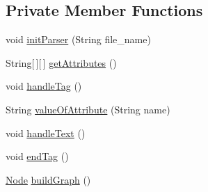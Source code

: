 \subsection*{Private Member Functions}
\begin{DoxyCompactItemize}
\item 
void \hyperlink{classch_1_1zhaw_1_1ba10__bsha__1_1_1graph_1_1GraphMLPullParser_adbe40e63ba94ad70d3dfc64b37c098b8}{initParser} (String file\_\-name)
\item 
String\mbox{[}$\,$\mbox{]}\mbox{[}$\,$\mbox{]} \hyperlink{classch_1_1zhaw_1_1ba10__bsha__1_1_1graph_1_1GraphMLPullParser_a74f06179a71e0990ec4601c9ce78df29}{getAttributes} ()
\item 
void \hyperlink{classch_1_1zhaw_1_1ba10__bsha__1_1_1graph_1_1GraphMLPullParser_aa5ab79571da883a79a97faaed6886f51}{handleTag} ()
\item 
String \hyperlink{classch_1_1zhaw_1_1ba10__bsha__1_1_1graph_1_1GraphMLPullParser_a4ae4bad785554b69b5f7cefb090b5250}{valueOfAttribute} (String name)
\item 
void \hyperlink{classch_1_1zhaw_1_1ba10__bsha__1_1_1graph_1_1GraphMLPullParser_a06f1ee797fdd3fe07b3665cbaf3413d9}{handleText} ()
\item 
void \hyperlink{classch_1_1zhaw_1_1ba10__bsha__1_1_1graph_1_1GraphMLPullParser_ae57851701120dd3a6c241c4057f88f34}{endTag} ()
\item 
\hyperlink{classch_1_1zhaw_1_1ba10__bsha__1_1_1graph_1_1Node}{Node} \hyperlink{classch_1_1zhaw_1_1ba10__bsha__1_1_1graph_1_1GraphMLPullParser_a5725aeb6453b75f4a0e7166bf4fe1023}{buildGraph} ()
\end{DoxyCompactItemize}

